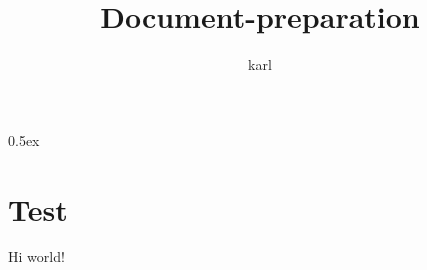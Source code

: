 \documentclass[11pt,a4paper]{article}
\begin{document}
\title{Document-preparation}
\author{karl}
\maketitle

\tableofcontents

\parindent 0pt\parskip 0.5ex

\tableofcontents




\section{Test}
Hi world!\\

%
%
\end{document}
